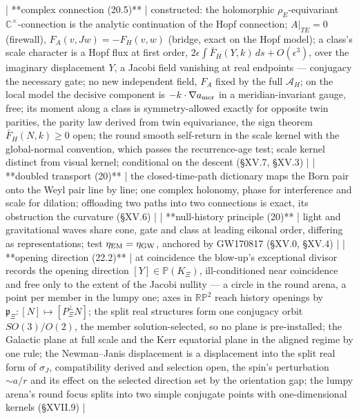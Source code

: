 | **complex connection (20.5)** | constructed: the holomorphic $\rho_E$-equivariant $\mathbb C^\times$-connection is the analytic continuation of the Hopf connection; $A\vert _{TE} = 0$ (firewall), $F_A(v,Jw) = -F_H(v,w)$ (bridge, exact on the Hopf model); a class's scale character is a Hopf flux at first order, $2\epsilon\int\bar F_H(Y,k)\,ds+O(\epsilon^3)$, over the imaginary displacement $Y$, a Jacobi field vanishing at real endpoints — conjugacy the necessary gate; no new independent field, $F_A$ fixed by the full $\mathcal A_H$; on the local model the decisive component is $-k\cdot\nabla a_{\rm mer}$ in a meridian-invariant gauge, free; its moment along a class is symmetry-allowed exactly for opposite twin parities, the parity law derived from twin equivariance, the sign theorem $\bar F_H(N,k)\ge0$ open; the round smooth self-return in the scale kernel with the global-normal convention, which passes the recurrence-age test; scale kernel distinct from visual kernel; conditional on the descent (§XV.7, §XV.3) |
| **doubled transport (20)** | the closed-time-path dictionary maps the Born pair onto the Weyl pair line by line; one complex holonomy, phase for interference and scale for dilation; offloading two paths into two connections is exact, its obstruction the curvature (§XV.6) |
| **null-history principle (20)** | light and gravitational waves share cone, gate and class at leading eikonal order, differing as representations; test $\eta_{\rm EM} = \eta_{\rm GW}$, anchored by GW170817 (§XV.0, §XV.4) |
| **opening direction (22.2)** | at coincidence the blow-up's exceptional divisor records the opening direction $[Y]\in\mathbb P(K_\Xi)$, ill-conditioned near coincidence and free only to the extent of the Jacobi nullity — a circle in the round arena, a point per member in the lumpy one; axes in $\mathbb{RP}^2$ reach history openings by $\mathfrak p_\Xi:[N]\mapsto[P^\perp_\Xi N]$; the split real structures form one conjugacy orbit $SO(3)/O(2)$, the member solution-selected, so no plane is pre-installed; the Galactic plane at full scale and the Kerr equatorial plane in the aligned regime by one rule; the Newman–Janis displacement is a displacement into the split real form of $\sigma_J$, compatibility derived and selection open, the spin's perturbation $\sim a/r$ and its effect on the selected direction set by the orientation gap; the lumpy arena's round focus splits into two simple conjugate points with one-dimensional kernels (§XVII.9) |
